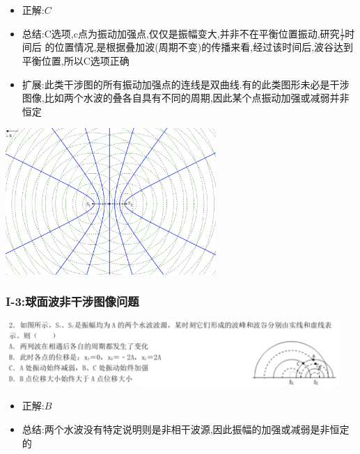 \documentclass{article}
\begin{document}
\begin{itemize}
    \item 正解:\quad $C$
    \item 总结:\quad C选项,c点为振动加强点,仅仅是振幅变大,并非不在平衡位置振动,研究$\frac{1}{T}$时间后
          的位置情况,是根据叠加波(周期不变)的传播来看,经过该时间后,波谷达到平衡位置,所以C选项正确
    \item 扩展:\quad 此类干涉图的所有振动加强点的连线是双曲线.有的此类图形未必是干涉图像,比如两个水波的叠各自具有不同的周期,因此某个点振动加强或减弱并非恒定
\end{itemize}

\begin{center}
    \includegraphics[width = 0.6\textwidth]{./pictures/2.1-2.png}
\end{center}

\vspace{2em}

\subsubsection{I-3:球面波非干涉图像问题}
\includegraphics[width = 0.95\textwidth]{./pictures/2.1-6.png}

\begin{itemize}
    \item 正解:\quad $B$
    \item 总结:\quad 两个水波没有特定说明则是非相干波源,因此振幅的加强或减弱是非恒定的
\end{itemize}

\vspace{2em}
\end{document}
